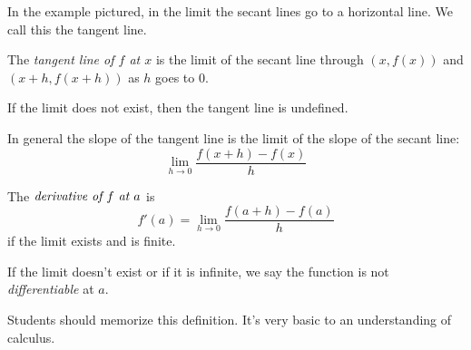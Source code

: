 \documentclass[11pt]{book}
\newcommand{\highlight}[1]{%
  \colorbox{yellow!50}{$\displaystyle#1$}}
\newenvironment{definition}[1][Definition]{\begin{trivlist}
\item[\hskip \labelsep {\bfseries #1}]}{\end{trivlist}}
\numberwithin{example}{chapter}
\begin{document}
In the example pictured, in the limit the secant lines go to a horizontal line.  We call this the tangent line.
\begin{center}
\end{center}


\begin{definition}
The \emph{tangent line of $f$ at $x$} is the limit of the secant line through $(x,f(x))$ and $(x+h,f(x+h))$ as $h$ goes to 0.  
\end{definition}

If the limit does not exist, then the tangent line is undefined.

In general the slope of the tangent line is the limit of the slope of the secant line:
$$\lim_{h\to 0} \frac{f(x+h)-f(x)}{h}$$




\begin{definition}
The \highlight{\emph{derivative of $f$ at $a$}} is 
$$f'(a)=\lim_{h\to 0} \frac{f(a+h)-f(a)}{h}$$
if the limit exists and is finite.
\end{definition}

If the limit doesn't exist or if it is infinite, we say the function is not \emph{differentiable} at $a$.

Students should memorize this definition.  It's very basic to an understanding of calculus.
\end{document}
